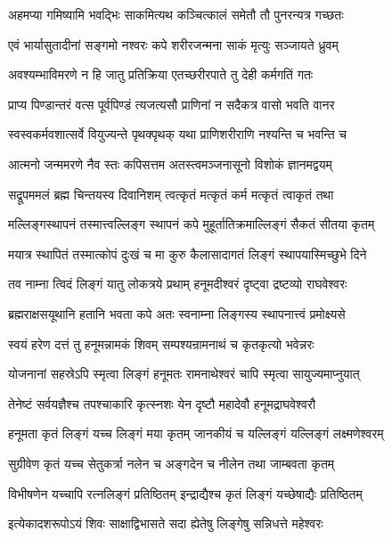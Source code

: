 \twolineshloka
{अहमप्या गमिष्यामि भवद्भिः साकमित्यथ}
{कञ्चित्कालं समेतौ तौ पुनरन्यत्र गच्छतः}%

\twolineshloka
{एवं भार्यासुतादीनां सङ्गमो नश्वरः कपे}
{शरीरजन्मना साकं मृत्युः सञ्जायते ध्रुवम्}%

\twolineshloka
{अवश्यम्भाविमरणे न हि जातु प्रतिक्रिया}
{एतच्छरीरपाते तु देही कर्मगतिं गतः}%

\twolineshloka
{प्राप्य पिण्डान्तरं वत्स पूर्वपिण्डं त्यजत्यसौ}
{प्राणिनां न सदैकत्र वासो भवति वानर}%

\twolineshloka
{स्वस्वकर्मवशात्सर्वे वियुज्यन्ते पृथक्पृथक्}
{यथा प्राणिशरीराणि नश्यन्ति च भवन्ति च}%

\twolineshloka
{आत्मनो जन्ममरणे नैव स्तः कपिसत्तम}
{अतस्त्वमञ्जनासूनो विशोकं ज्ञानमद्वयम्}%

\twolineshloka
{सद्रूपममलं ब्रह्म चिन्तयस्व दिवानिशम्}
{त्वत्कृतं मत्कृतं कर्म मत्कृतं त्वाकृतं तथा}%

\twolineshloka
{मल्लिङ्गस्थापनं तस्मात्त्वल्लिङ्ग स्थापनं कपे}
{मुहूर्तातिक्रमाल्लिङ्गं सैकतं सीतया कृतम्}%

\twolineshloka
{मयात्र स्थापितं तस्मात्कोपं दुःखं च मा कुरु}
{कैलासादागतं लिङ्गं स्थापयास्मिच्छुभे दिने}%

\twolineshloka
{तव नाम्ना त्विदं लिङ्गं यातु लोकत्रये प्रथाम्}
{हनूमदीश्वरं दृष्ट्वा द्रष्टव्यो राघवेश्वरः}%

\twolineshloka
{ब्रह्मराक्षसयूथानि हतानि भवता कपे}
{अतः स्वनाम्ना लिङ्गस्य स्थापनात्त्वं प्रमोक्ष्यसे}%

\twolineshloka
{स्वयं हरेण दत्तं तु हनूमन्नामकं शिवम्}
{सम्पश्यन्रामनाथं च कृतकृत्यो भवेन्नरः}%

\twolineshloka
{योजनानां सहस्रेऽपि स्मृत्वा लिङ्गं हनूमतः}
{रामनाथेश्वरं चापि स्मृत्वा सायुज्यमाप्नुयात्}%

\twolineshloka
{तेनेष्टं सर्वयज्ञैश्च तपश्चाकारि कृत्स्नशः}
{येन दृष्टौ महादेवौ हनूमद्राघवेश्वरौ}%

\twolineshloka
{हनूमता कृतं लिङ्गं यच्च लिङ्गं मया कृतम्}
{जानकीयं च यल्लिङ्गं यल्लिङ्गं लक्ष्मणेश्वरम्}%

\twolineshloka
{सुग्रीवेण कृतं यच्च सेतुकर्त्रा नलेन च}
{अङ्गदेन च नीलेन तथा जाम्बवता कृतम्}%

\twolineshloka
{विभीषणेन यच्चापि रत्नलिङ्गं प्रतिष्ठितम्}
{इन्द्राद्यैश्च कृतं लिङ्गं यच्छेषाद्यैः प्रतिष्ठितम्}%

\twolineshloka
{इत्येकादशरूपोऽयं शिवः साक्षाद्विभासते}
{सदा ह्येतेषु लिङ्गेषु सन्निधत्ते महेश्वरः}%

